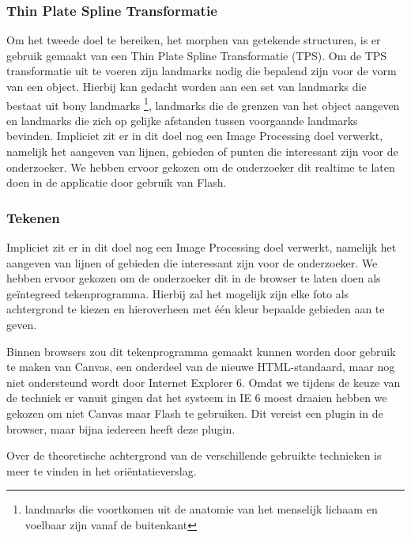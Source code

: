 \subsubsection{Thin Plate Spline Transformatie}
Om het tweede doel te bereiken, het morphen van getekende structuren, is er gebruik gemaakt van een Thin Plate Spline Transformatie (TPS). Om de TPS transformatie uit te voeren zijn landmarks nodig die bepalend zijn voor de vorm van een object. Hierbij kan gedacht worden aan een set van landmarks die bestaat uit bony landmarks \footnote{landmarks die voortkomen uit de anatomie van het menselijk lichaam en voelbaar zijn vanaf de buitenkant}, landmarks die de grenzen van het object aangeven en landmarks die zich op gelijke afstanden tussen voorgaande landmarks bevinden. 
Impliciet zit er in dit doel nog een Image Processing doel verwerkt, namelijk het aangeven van lijnen, gebieden of punten die interessant zijn voor de onderzoeker. We hebben ervoor gekozen om de onderzoeker dit realtime te laten doen in de applicatie door gebruik van Flash.


\subsubsection{Tekenen}
Impliciet zit er in dit doel nog een Image Processing doel verwerkt, namelijk het aangeven van lijnen of gebieden die interessant zijn voor de onderzoeker. We hebben ervoor gekozen om de onderzoeker dit in de browser te laten doen als ge\"{i}ntegreed tekenprogramma. Hierbij zal het mogelijk zijn elke foto als achtergrond te kiezen en hieroverheen met \'{e}\'{e}n kleur bepaalde gebieden aan te geven.

Binnen browsers zou dit tekenprogramma gemaakt kunnen worden door gebruik te maken van Canvas, een onderdeel van de nieuwe HTML-standaard, maar nog niet ondersteund wordt door Internet Explorer 6. Omdat we tijdens de keuze van de techniek er vanuit gingen dat het systeem in IE 6 moest draaien hebben we gekozen om niet Canvas maar Flash te gebruiken. Dit vereist een plugin in de browser, maar bijna iedereen heeft deze plugin.

Over de theoretische achtergrond van de verschillende gebruikte technieken is meer te vinden in het ori\"{e}ntatieverslag.
